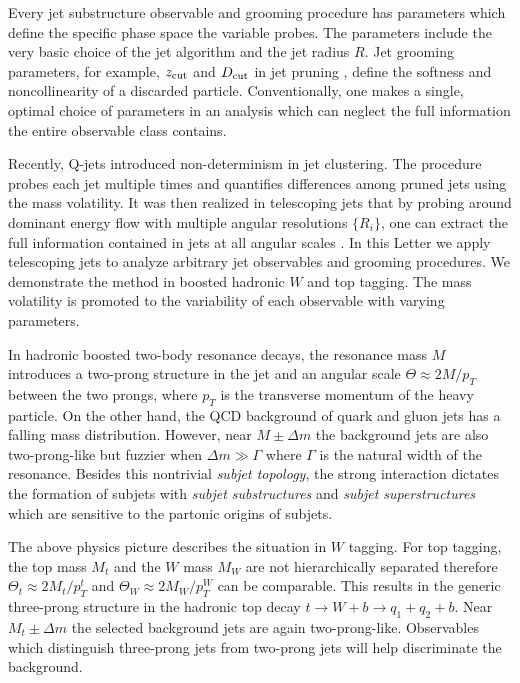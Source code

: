 \documentclass[aps,prl,floatfix,preprintnumbers,twocolumn,groupedaddress,nofootinbib]{revtex4-1}
\begin{document}
Every jet substructure observable and grooming procedure has parameters which define the specific phase space the variable probes. The parameters include the very basic choice of the jet algorithm \cite{Ellis:1993tq,Catani:1993hr,Cacciari:2008gp,Dokshitzer:1997in,Wobisch:1998wt} and the jet radius $R$. Jet grooming parameters, for example, $z_{\rm cut}$ and $D_{\rm cut}$ in jet pruning \cite{Ellis:2009su,Ellis:2009me}, define the softness and noncollinearity of a discarded particle. %
Conventionally, one makes a single, optimal choice of parameters in an analysis which can neglect the full information the entire observable class contains.

Recently, Q-jets \cite{Ellis:2012sn} introduced non-determinism in jet clustering. The procedure probes each jet multiple times and quantifies differences among pruned jets using the mass volatility. It was then realized in telescoping jets \cite{Chien:2013kca} that by probing around dominant energy flow with multiple angular resolutions $\{R_i\}$, one can extract the full information contained in jets at all angular scales \cite{Chien:2014hla}. In this Letter we apply telescoping jets to analyze arbitrary jet observables and grooming procedures. We demonstrate the method in boosted hadronic $W$ and top tagging. The mass volatility is promoted to the variability of each observable with varying parameters.

In hadronic boosted two-body resonance decays, the resonance mass $M$ introduces a two-prong structure in the jet and an angular scale $\Theta\approx 2M/p_T$ between the two prongs, where $p_T$ is the transverse momentum of the heavy particle. On the other hand, the QCD background of quark and gluon jets has a falling mass distribution. However, near $M\pm\Delta m$ the background jets are also two-prong-like but fuzzier when $\Delta m\gg\Gamma$ where $\Gamma$ is the natural width of the resonance. Besides this nontrivial {\sl subjet topology}, the strong interaction dictates the formation of subjets with {\sl subjet substructures} and {\sl subjet superstructures} \cite{Gallicchio:2010sw} which are sensitive to the partonic origins of subjets. %

The above physics picture describes the situation in $W$ tagging. For top tagging, the top mass $M_t$ and the $W$ mass $M_W$ are not hierarchically separated therefore $\Theta_t \approx 2M_t/p_T^t$ and $\Theta_W \approx 2M_W/p_T^W$ can be comparable. This results in the generic three-prong structure in the hadronic top decay $t\rightarrow W+b \rightarrow q_1 + q_2 +b$. Near $M_t\pm \Delta m$ the selected background jets are again two-prong-like. Observables which distinguish three-prong jets from two-prong jets will help discriminate the background.
\end{document}
